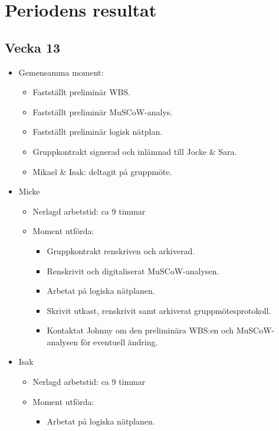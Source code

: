 \section{Periodens resultat}
\subsection*{Vecka 13}

\begin{itemize}[noitemsep]
    \item Gemensamma moment:
    \begin{itemize}[noitemsep]
        \item Fastställt preliminär WBS.
        \item Fastställt preliminär MuSCoW-analys.
        \item Fastställt preliminär logisk nätplan.
        \item Gruppkontrakt signerad och inlämnad till Jocke \& Sara.
        \item Mikael \& Isak: deltagit på gruppmöte.
    \end{itemize}
    \item Micke
    \begin{itemize}[noitemsep]
        \item Nerlagd arbetstid: ca 9 timmar
        \item Moment utförda:
        \begin{itemize}[noitemsep]
            \item Gruppkontrakt renskriven och arkiverad.
            \item Renskrivit och digitaliserat MuSCoW-analysen.
            \item Arbetat på logiska nätplanen.
            \item Skrivit utkast, renskrivit samt arkiverat gruppmötesprotokoll.
            \item Kontaktat Johnny om den preliminära WBS:en och MuSCoW-analysen för eventuell ändring.
        \end{itemize}
    \end{itemize}
    \item Isak
    \begin{itemize}[noitemsep]
        \item Nerlagd arbetstid: ca 9 timmar
        \item Moment utförda:
        \begin{itemize}[noitemsep]
            \item Arbetat på logiska nätplanen.

\end{itemize}
\end{itemize}
\end{itemize}
